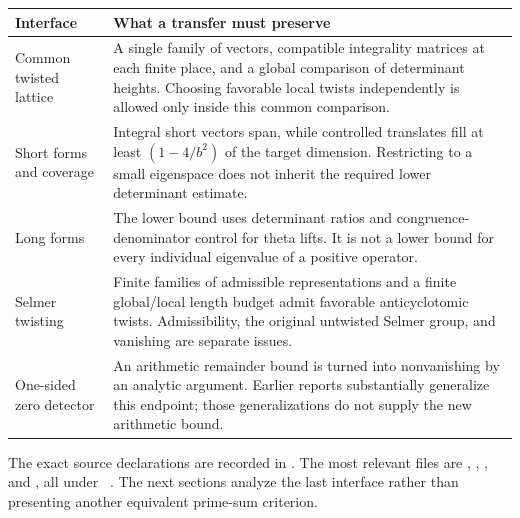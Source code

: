 \begin{longtable}{p{}p{}}
\toprule
Interface & What a transfer must preserve\\\midrule
\endhead
Common twisted lattice & A single family of vectors, compatible integrality
matrices at each finite place, and a global comparison of determinant heights.
Choosing favorable local twists independently is allowed only inside this
common comparison.\\
Short forms and coverage & Integral short vectors span, while controlled
translates fill at least $(1-4/b^2)$ of the target dimension. Restricting to a
small eigenspace does not inherit the required lower determinant estimate.\\
Long forms & The lower bound uses determinant ratios and congruence-denominator
control for theta lifts. It is not a lower bound for every individual
eigenvalue of a positive operator.\\
Selmer twisting & Finite families of admissible representations and a finite
global/local length budget admit favorable anticyclotomic twists. Admissibility,
the original untwisted Selmer group, and vanishing are separate issues.\\
One-sided zero detector & An arithmetic remainder bound is turned into
nonvanishing by an analytic argument. Earlier reports substantially generalize
this endpoint; those generalizations do not supply the new arithmetic bound.\\
\bottomrule
\end{longtable}

The exact source declarations are recorded in
. The most relevant files are
,
,
, and
, all under
~\cite{mainineq,selmerdata,mirror}.
The next sections analyze the last interface rather than presenting another
equivalent prime-sum criterion.
